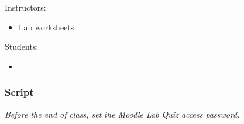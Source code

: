 \documentclass[12pt]{article}
\begin{document}
Instructors:
\begin{itemize}
\item Lab worksheets
\end{itemize}

\noindent
Students:
\begin{itemize}
\item 
\end{itemize}


\subsubsection{Script}


\emph{Before the end of class, set the Moodle Lab Quiz access password.}
\end{document}
